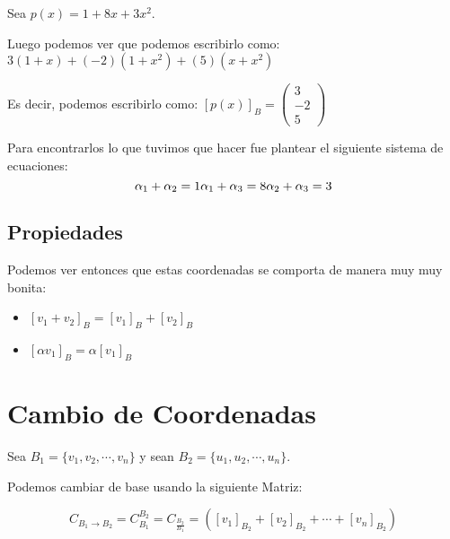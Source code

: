 \documentclass[12pt]{report}							    %
\begin{document}
        Sea $p(x) = 1+8x+3x^2$.

        Luego podemos ver que podemos escribirlo como:
        $3(1+x) + (-2)(1+x^2) + (5)(x+x^2)$

        Es decir, podemos escribirlo como:
        $[p(x)]_B =  \begin{pmatrix} 3\\-2\\5\end{pmatrix}$
         

        Para encontrarlos lo que tuvimos que hacer fue plantear el siguiente sistema de ecuaciones:
        \begin{equation*}
            \alpha_1 + \alpha_2 = 1  \\
            \alpha_1 + \alpha_3 = 8  \\
            \alpha_2 + \alpha_3 = 3  \\
        \end{equation*}


        \subsection{Propiedades}
        Podemos ver entonces que estas coordenadas se comporta de manera muy muy bonita:

        \begin{itemize}
            \item $[v_1 + v_2]_B = [v_1]_B + [v_2]_B$
            \item $[\alpha v_1]_B = \alpha [v_1]_B$
        \end{itemize}



    \clearpage
    \section{Cambio de Coordenadas}

        Sea $B_1 = \{v_1,v_2, \cdots, v_n\}$ y sean  $B_2 = \{u_1,u_2, \cdots, u_n\}$.

        Podemos cambiar de base usando la siguiente Matriz:

        \begin{equation*}
            C_{B_1 \to B_2}= C_{B_1}^{B_2} = C_{\frac{B_2}{B_1}} = \left( [v_1]_{B_2} + [v_2]_{B_2} + \cdots + [v_n]_{B_2}   \right)
        \end{equation*}
\end{document}
